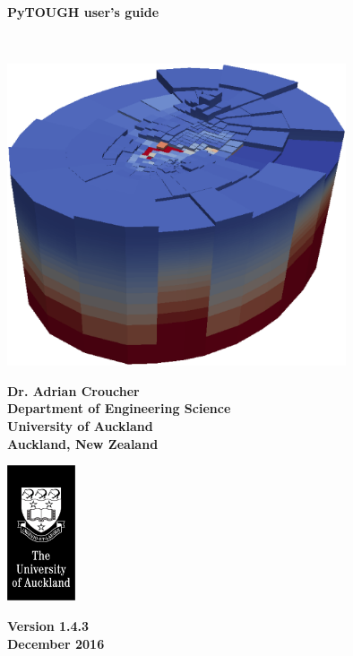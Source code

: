 \begin{titlepage}

\begin{center}

\bigskip\

\textbf{\Huge{PyTOUGH user's guide}}

\bigskip\

\includegraphics[width=0.75\textwidth]{coverpic}

\bigskip

\textbf{\large{Dr. Adrian Croucher\\
Department of Engineering Science\\
University of Auckland\\
Auckland, New Zealand}}

\bigskip
\bigskip
\bigskip

\includegraphics[height=4cm]{UoA_logo}

\bigskip
\bigskip
\bigskip
\bigskip

\textbf{\large{Version 1.4.3\\December 2016}}

\end{center}
\end{titlepage}

